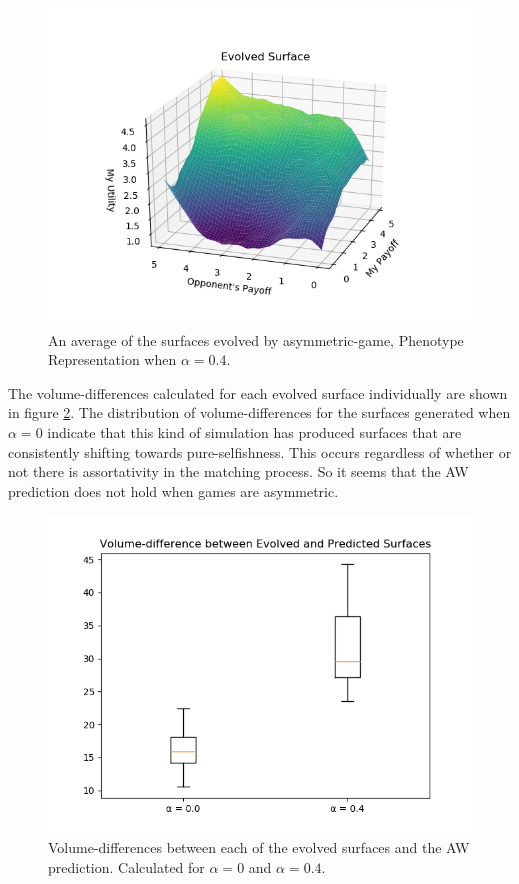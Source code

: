 \documentclass[11pt]{book}
\newcommand*{\np}{\par\noindent\newline}
\begin{document}
\begin{figure}
	\centering
	\includegraphics[scale=0.75]{resources/asymmetric_average_evolved_surface_r_04.png}
	\caption{An average of the surfaces evolved by asymmetric-game, Phenotype Representation when $\alpha = 0.4$.}
	\label{average_r_04_asymmetric_evolved}
\end{figure}

\np The volume-differences calculated for each evolved surface individually are shown in figure \ref{asymmetric_distance_boxplot_r_00_04}.
The distribution of volume-differences for the surfaces generated when $\alpha = 0$ indicate that this kind of simulation has produced surfaces that are consistently shifting towards pure-selfishness.
This occurs regardless of whether or not there is assortativity in the matching process. 
So it seems that the AW prediction does not hold when games are asymmetric.


\begin{figure}
	\centering
	\includegraphics[scale=0.6]{resources/asymmetric_distance_boxplot_r_00_04.png}
	\caption{Volume-differences between each of the evolved surfaces and the AW prediction. Calculated for $\alpha = 0$ and $\alpha = 0.4$.}
	\label{asymmetric_distance_boxplot_r_00_04}
\end{figure}
\end{document}
